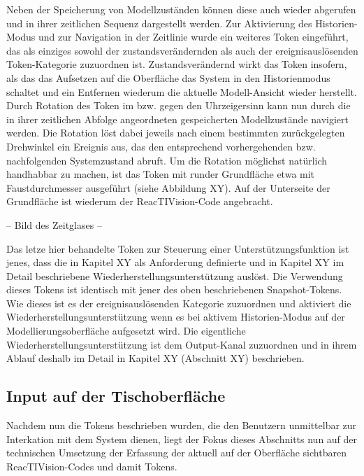 Neben der Speicherung von Modellzuständen können diese auch wieder abgerufen und in ihrer zeitlichen Sequenz dargestellt werden. Zur Aktivierung des Historien-Modus und zur Navigation in der Zeitlinie wurde ein weiteres Token eingeführt, das als einziges sowohl der zustandsverändernden als auch der ereignisauslösenden Token-Kategorie zuzuordnen ist. Zustandsverändernd wirkt das Token insofern, als das das Aufsetzen auf die Oberfläche das System in den Historienmodus schaltet und ein Entfernen wiederum die aktuelle Modell-Ansicht wieder herstellt. Durch Rotation des Token im bzw. gegen den Uhrzeigersinn kann nun durch die in ihrer zeitlichen Abfolge angeordneten gespeicherten Modellzustände navigiert werden. Die Rotation löst dabei jeweils nach einem bestimmten zurückgelegten Drehwinkel ein Ereignis aus, das den entsprechend vorhergehenden bzw. nachfolgenden Systemzustand abruft. Um die Rotation möglichst natürlich handhabbar zu machen, ist das Token mit runder Grundfläche etwa mit Faustdurchmesser ausgeführt (siehe Abbildung XY). Auf der Unterseite der Grundfläche ist wiederum der ReacTIVision-Code angebracht.

-- Bild des Zeitglases --

Das letze hier behandelte Token zur Steuerung einer Unterstützungsfunktion ist jenes, dass die in Kapitel XY als Anforderung definierte und in Kapitel XY im Detail beschriebene Wiederherstellungsunterstützung auslöst. Die Verwendung dieses Tokens ist identisch mit jener des oben beschriebenen Snapshot-Tokens. Wie dieses ist es der ereignisauslösenden Kategorie zuzuordnen und aktiviert die Wiederherstellungsunterstützung wenn es bei aktivem Historien-Modus auf der Modellierungsoberfläche aufgesetzt wird. Die eigentliche Wiederherstellungsunterstützung ist dem Output-Kanal zuzuordnen und in ihrem Ablauf deshalb im Detail in Kapitel XY (Abschnitt XY) beschrieben.


\subsection{Input auf der Tischoberfläche} %
\label{sub:input_auf_der_tischoberfläche}

Nachdem nun die Tokens beschrieben wurden, die den Benutzern unmittelbar zur Interkation mit dem System dienen, liegt der Fokus dieses Abschnitts nun auf der technischen Umsetzung der Erfassung der aktuell auf der Oberfläche sichtbaren ReacTIVision-Codes und damit Tokens.

